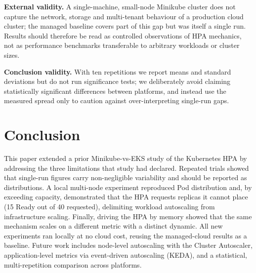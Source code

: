 \documentclass[conference]{IEEEtran}
\begin{document}
\textbf{External validity.} A single-machine, small-node Minikube cluster does not
capture the network, storage and multi-tenant behaviour of a production cloud
cluster; the managed baseline covers part of this gap but was itself a single
run. Results should therefore be read as controlled observations of HPA mechanics,
not as performance benchmarks transferable to arbitrary workloads or cluster
sizes.

\textbf{Conclusion validity.} With ten repetitions we report means and standard
deviations but do not run significance tests; we deliberately avoid claiming
statistically significant differences between platforms, and instead use the
measured spread only to caution against over-interpreting single-run gaps.

\section{Conclusion}
\label{sec:conc}
This paper extended a prior Minikube-vs-EKS study of the Kubernetes HPA by
addressing the three limitations that study had declared. Repeated trials showed
that single-run figures carry non-negligible variability and should be reported
as distributions. A local multi-node experiment reproduced Pod distribution and,
by exceeding capacity, demonstrated that the HPA requests replicas it cannot
place (15 Ready out of 40 requested), delimiting workload autoscaling from
infrastructure scaling. Finally, driving the HPA by memory showed that the same
mechanism scales on a different metric with a distinct dynamic. All new
experiments ran locally at no cloud cost, reusing the managed-cloud results as a
baseline. Future work includes node-level autoscaling with the Cluster
Autoscaler, application-level metrics via event-driven autoscaling (KEDA), and a
statistical, multi-repetition comparison across platforms.
\end{document}
